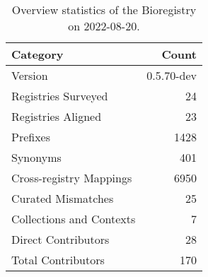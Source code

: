 \begin{table}
\centering
\caption{Overview statistics of the Bioregistry on 2022-08-20.}
\label{tab:bioregistry-summary}
\begin{tabular}{lr}
\toprule
                Category &      Count \\
\midrule
                 Version & 0.5.70-dev \\
     Registries Surveyed &         24 \\
      Registries Aligned &         23 \\
                Prefixes &       1428 \\
                Synonyms &        401 \\
 Cross-registry Mappings &       6950 \\
      Curated Mismatches &         25 \\
Collections and Contexts &          7 \\
     Direct Contributors &         28 \\
      Total Contributors &        170 \\
\bottomrule
\end{tabular}
\end{table}
